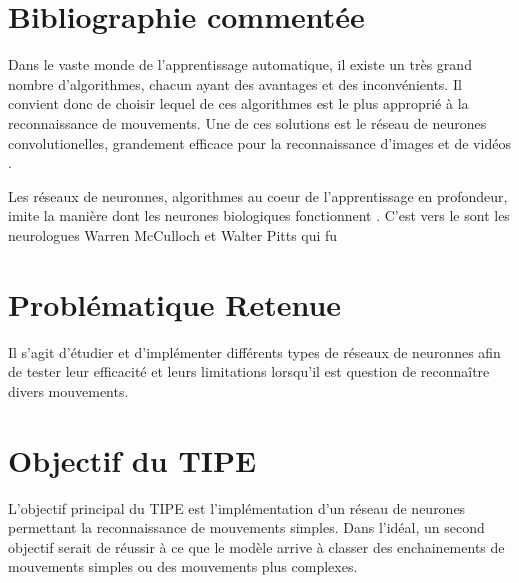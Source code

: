 \documentclass[a4paper, 11pt]{article}
\let\cite=\supercite
\begin{document}
\section*{Bibliographie comment\'ee}

Dans le vaste monde de l'apprentissage automatique, il existe un très grand nombre
d'algorithmes, chacun ayant des avantages et des inconvénients. Il convient donc de
choisir lequel de ces algorithmes est le plus approprié à la reconnaissance de
mouvements.
Une de ces solutions est le réseau de neurones convolutionelles, grandement efficace
pour la reconnaissance d'images et de vidéos \cite{cnn}.

Les réseaux de neuronnes, algorithmes au coeur de l'apprentissage en
profondeur, imite la manière dont les neurones biologiques fonctionnent 
\cite{web:nnBook}. C'est vers le sont les neurologues Warren McCulloch et Walter Pitts qui fu


\section*{Probl\'ematique Retenue}

Il s'agit d'étudier et d'implémenter différents types de réseaux de neuronnes afin de
tester leur efficacité et leurs limitations lorsqu'il est question de reconnaître 
divers mouvements.

\section*{Objectif du TIPE}
\begin{enumerate}
    L'objectif principal du TIPE est l'implémentation d'un réseau de neurones
    permettant la reconnaissance de mouvements simples. Dans l'idéal, un second objectif
    serait de réussir à ce que le modèle arrive à classer des enchainements de mouvements
    simples ou des mouvements plus complexes.
\end{enumerate}


\printbibliography[title=Références bibliographiques] 
\end{document}
